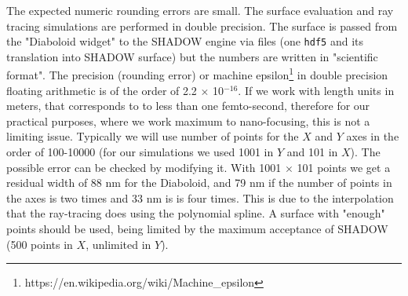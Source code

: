 \documentclass[a4paper, 11pt]{article}
\begin{document}

 
The expected numeric rounding errors are small. The surface evaluation and ray tracing simulations are performed in double precision. The surface is passed from the "Diaboloid widget" to the SHADOW engine via files (one {\tt hdf5} and its translation into SHADOW surface) but the numbers are written in "scientific format". The precision (rounding error) or machine epsilon\footnote{ https://en.wikipedia.org/wiki/Machine\_epsilon} in double precision floating arithmetic is of the order of 2.2 $\times$ 10$^{-16}$. If we work with length units in meters, that corresponds to to less than one femto-second, therefore for our practical purposes, where we work maximum to nano-focusing, this is not a limiting issue. Typically we will use number of points for the $X$ and $Y$ axes in the order of 100-10000 (for our simulations we used 1001 in $Y$ and 101 in $X$). The possible error can be checked by modifying it. With 1001 $\times$ 101 points we get a residual width of 88 nm for the Diaboloid, and 79 nm if the number of points in the axes is two times and 33 nm is is four times. This is due to the interpolation that the ray-tracing does using the polynomial spline. A surface with "enough" points should be used, being limited by the maximum acceptance of SHADOW (500 points in $X$, unlimited in $Y$). 
\end{document}
